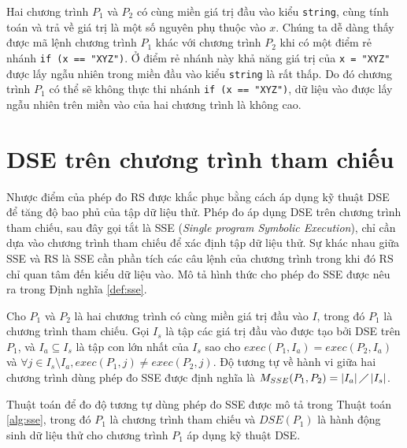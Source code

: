 Hai chương trình $P_{1}$ và $P_{2}$ có cùng miền giá trị đầu vào 
kiểu \texttt{string}, cùng tính toán và trả về giá trị là một số 
nguyên phụ thuộc vào $ x $. Chúng ta dễ dàng thấy được mã lệnh 
chương trình $P_{1}$ khác với chương trình $P_{2}$ khi có một 
điểm rẻ nhánh \texttt{if (x == "XYZ")}. Ở điểm rẻ nhánh này khả 
năng giá trị của \texttt{x = "XYZ"} được lấy ngẫu nhiên trong miền 
đầu vào kiểu \texttt{string} là rất thấp. Do đó chương trình $P_{1}$ 
có thể sẽ không thực thi nhánh \texttt{if (x == "XYZ")}, dữ liệu vào 
được lấy ngẫu nhiên trên miền vào của hai chương trình là không cao.

\section{DSE trên chương trình tham chiếu}

Nhược điểm của phép đo RS được khắc phục bằng cách áp dụng kỹ thuật
DSE để tăng độ bao phủ của tập dữ liệu thử. Phép đo áp dụng DSE trên
chương trình tham chiếu, sau đây gọi tắt là SSE (\emph{Single program
  Symbolic Execution}), chỉ cần dựa vào chương trình tham chiếu để xác
định tập dữ liệu thử. Sự khác nhau giữa SSE và RS là SSE cần phần tích
các câu lệnh của chương trình trong khi đó RS chỉ quan tâm đến kiểu dữ
liệu vào. Mô tả hình thức cho phép đo SSE được nêu ra trong Định nghĩa
\ref{def:sse}.

\begin{definition}
  \label{def:sse}
  Cho $P_{1}$ và $P_{2}$ là hai chương trình có cùng miền giá trị đầu
  vào $I$, trong đó $P_{1}$ là chương trình tham chiếu. Gọi $I_{s}$ là
  tập các giá trị đầu vào được tạo bởi DSE trên $P_{1}$, và
  $I_{a} \subseteq I_s$ là tập con lớn nhất của $I_{s}$ sao cho
  $exec(P_{1}, I_a) = exec(P_{2}, I_a)$ và
  $\forall j \in I_{s} \setminus I_{a}, exec(P_{1}, j) \neq
  exec(P_{2}, j)$. Độ tương tự về hành vi giữa hai chương trình dùng
  phép đo SSE được định nghĩa là
  $M_{SSE}(P_{1}, P_{2}) = \left|I_{a}\right| \diagup
  \left|I_{s}\right| $.
\end{definition}

Thuật toán để đo độ tương tự dùng phép đo SSE được mô tả trong
Thuật toán \ref{alg:sse}, trong đó $P_1$ là chương trình tham chiếu và
$DSE(P_{1})$ là hành động sinh dữ liệu thử cho chương trình $P_1$ áp
dụng kỹ thuật DSE.

